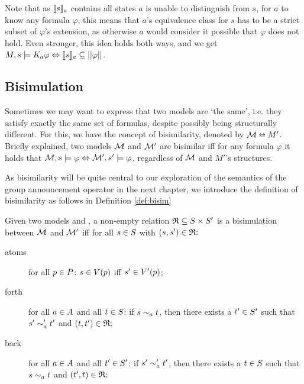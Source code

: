  Note that as $\llbracket s\rrbracket_a$ contains all states $a$ is unable to distinguish from $s$, for $a$ to know any formula $\varphi$, this means that $a$'s equivalence class for $s$ has to be a strict subset of $\varphi$'s extension, as otherwise $a$ would consider it possible that $\varphi$ does not hold. Even stronger, this idea holds both ways, and we get $M,s\models K_a\varphi \Leftrightarrow \llbracket s\rrbracket_a \subseteq ||\varphi||$.

\subsection{Bisimulation}

Sometimes we may want to express that two models are `the same', i.e. they satisfy exactly the same set of formulas, despite possibly being structurally different. For this, we have the concept of bisimilarity, denoted by $\mathcal{M} \leftrightarroweq M'$. Briefly explained, two models $\mathcal{M}$ and $\mathcal{M}'$ are bisimilar iff for any formula $\varphi$ it holds that $\mathcal{M},s\models\varphi \Leftrightarrow \mathcal{M}',s'\models\varphi$, regardless of $\mathcal{M}$ and $M'$'s structures. 

As bisimilarity will be quite central to our exploration of the semantics of the group announcement operator in the next chapter, we introduce the definition of bisimilarity as follows in Definition \ref{def:bisim}

\begin{definition}[Bisimulation]\label{def:bisim}
	Given two models \model{} and , a non-empty relation $\mathfrak{R}\subseteq S \times S '$  is a bisimulation between $\mathcal{M}$ and $\mathcal{M}'$ iff for all $s \in S$ with $(s,s') \in \mathfrak{R}\mathfrak{:}$
	\begin{description}
		\item[atoms] for all $p \in P$: $s\in V(p)$ iff $s'\in V '(p)$;
		\item[forth]  for all $a \in A$ and all $t \in S$: if $s\sim_a t$, then there exists a $t'\in S '$ such that $s'\sim'_a t'$ and $(t,t')\in\mathfrak{R}\mathfrak{;}$
		\item[back] for all $a \in A$ and all $t' \in S'$: if $s'\sim'_a t'$, then there exists a $t\in S $ such that $s\sim_a t$ and $(t',t)\in\mathfrak{R}\mathfrak{;}$
	\end{description}
\end{definition} 

